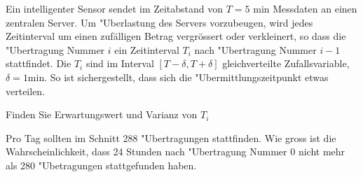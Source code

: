 Ein intelligenter Sensor sendet im Zeitabstand von $T=\text{5 min}$
Messdaten an einen zentralen Server. Um "Uberlastung des Servers
vorzubeugen, wird jedes
Zeitinterval um einen zufälligen Betrag vergrössert oder verkleinert, so
dass die "Ubertragung Nummer $i$ ein Zeitinterval $T_i$ nach "Ubertragung
Nummer $i-1$ stattfindet.
Die $T_i$ sind im Interval $[T-\delta,T+\delta]$
gleichverteilte Zufallsvariable, $\delta = \text{1min}$.
So ist sichergestellt, dass sich die "Ubermittlungszeitpunkt etwas verteilen.
\begin{teilaufgaben}
\item Finden Sie Erwartungswert und Varianz von $T_i$
\item Pro Tag sollten im Schnitt 288 "Ubertragungen stattfinden. Wie gross
ist die Wahrscheinlichkeit, dass 24 Stunden nach "Ubertragung Nummer $0$
nicht mehr als 280 "Ubetragungen stattgefunden haben.
\end{teilaufgaben}



